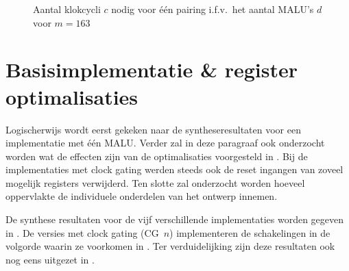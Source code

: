 \begin{figure}[h]
	\centering
		\caption{Aantal klokcycli $c$ nodig voor \'e\'en pairing i.f.v.\ het aantal MALU's $d$ voor $m = 163$\label{figuur-resultaten-multi-cycles}}
\end{figure}

\section{Basisimplementatie \& register optimalisaties\label{section-resultaten-basisimplementatie}}

Logischerwijs wordt eerst gekeken naar de syntheseresultaten voor een implementatie met \'e\'en MALU. Verder zal in deze paragraaf ook onderzocht worden wat de effecten zijn van de optimalisaties voorgesteld in . Bij de implementaties met clock gating werden steeds ook de reset ingangen van zoveel mogelijk registers verwijderd. Ten slotte zal onderzocht worden hoeveel oppervlakte de individuele onderdelen van het ontwerp innemen.

De synthese resultaten voor de vijf verschillende implementaties worden gegeven in . De versies met clock gating (CG~$n$) implementeren de schakelingen in de volgorde waarin ze voorkomen in . Ter verduidelijking zijn deze resultaten ook nog eens uitgezet in .


